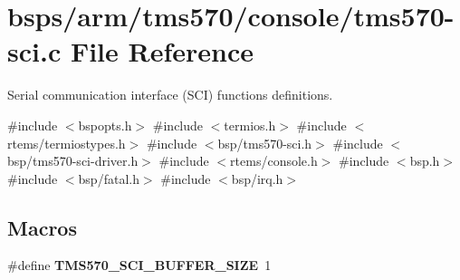 \hypertarget{tms570-sci_8c}{}\section{bsps/arm/tms570/console/tms570-\/sci.c File Reference}
\label{tms570-sci_8c}


Serial communication interface (S\+CI) functions definitions.  


{\ttfamily \#include $<$bspopts.\+h$>$}\newline
{\ttfamily \#include $<$termios.\+h$>$}\newline
{\ttfamily \#include $<$rtems/termiostypes.\+h$>$}\newline
{\ttfamily \#include $<$bsp/tms570-\/sci.\+h$>$}\newline
{\ttfamily \#include $<$bsp/tms570-\/sci-\/driver.\+h$>$}\newline
{\ttfamily \#include $<$rtems/console.\+h$>$}\newline
{\ttfamily \#include $<$bsp.\+h$>$}\newline
{\ttfamily \#include $<$bsp/fatal.\+h$>$}\newline
{\ttfamily \#include $<$bsp/irq.\+h$>$}\newline
\subsection*{Macros}
\begin{DoxyCompactItemize}
\item 
\mbox{\label{tms570-sci_8c_acb8120fafa31525f04b133323f5a7b5c}} 
\#define {\bfseries T\+M\+S570\+\_\+\+S\+C\+I\+\_\+\+B\+U\+F\+F\+E\+R\+\_\+\+S\+I\+ZE}~1
\end{DoxyCompactItemize}
